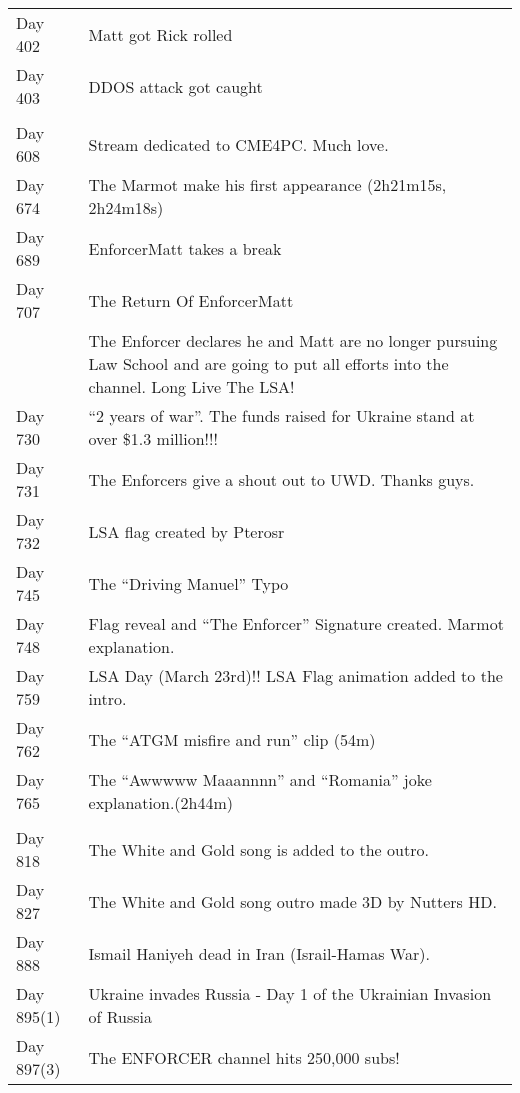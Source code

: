 \begin{longtable}{l p{12cm}}
Day 402 & Matt got Rick rolled \\
Day 403 & DDOS attack got caught \\
& \\
Day 608 & Stream dedicated to CME4PC. Much love. \\
Day 674 & The Marmot make his first appearance (2h21m15s, 2h24m18s) \\
Day 689 & EnforcerMatt takes a break \\
Day 707 & The Return Of EnforcerMatt \\
        &
  The Enforcer declares he and Matt are no longer pursuing Law School
  and are going to put all efforts into the channel. Long Live The LSA! \\
Day 730 & ``2 years of war''. The funds raised for Ukraine stand at over \$1.3 million!!! \\ 
Day 731 & The Enforcers give a shout out to UWD. Thanks guys. \\
Day 732 & LSA flag created by Pterosr \\
Day 745 & The ``Driving Manuel'' Typo \\
Day 748 & Flag reveal and ``The Enforcer'' Signature created. Marmot explanation. \\
Day 759 & LSA Day (March 23rd)!! LSA Flag animation added to the intro. \\
Day 762 & The ``ATGM misfire and run'' clip (54m) \\
Day 765 & The ``Awwwww Maaannnn'' and ``Romania'' joke explanation.(2h44m) \\
& \\
Day 818 & The White and Gold song is added to the outro. \\
Day 827 & The White and Gold song outro made 3D by Nutters HD. \\
Day 888 & Ismail Haniyeh dead in Iran (Israil-Hamas War). \\
Day 895(1) & Ukraine invades Russia - Day 1 of the Ukrainian Invasion of Russia \\
Day 897(3) & The ENFORCER channel hits 250,000 subs! \\
\end{longtable}

